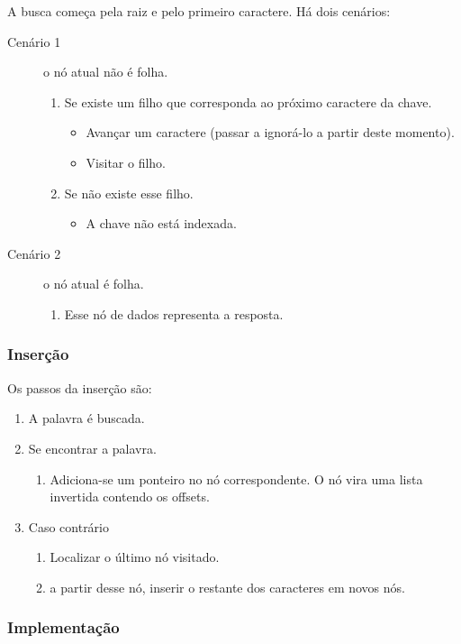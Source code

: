 A busca começa pela raiz e pelo primeiro caractere.
Há dois cenários:
\begin{description}
\item[Cenário 1] o nó atual não é folha.
	\begin{enumerate}
	\item Se existe um filho que corresponda ao próximo caractere da chave.
		\begin{itemize}
		\item Avançar um caractere (passar a ignorá-lo a partir deste momento).
		\item Visitar o filho.
		\end{itemize}
	\item Se não existe esse filho.
		\begin{itemize}
		\item A chave não está indexada.
		\end{itemize}
	\end{enumerate}
\item[Cenário 2]  o nó atual é folha.
	\begin{enumerate}
	\item Esse nó de dados representa a resposta.
	\end{enumerate}
\end{description}

\subsubsection{Inserção}

Os passos da inserção são:
\begin{enumerate}
\item A palavra é buscada.
\item Se encontrar a palavra.
	\begin{enumerate}
	\item Adiciona-se um ponteiro no nó correspondente. O nó vira uma lista invertida contendo
	os offsets.
	\end{enumerate}
\item Caso contrário 
	\begin{enumerate}
	\item Localizar o último nó visitado.
	\item a partir desse nó, inserir o restante dos caracteres em novos nós.
	\end{enumerate}
\end{enumerate}

\subsubsection{Implementação}

